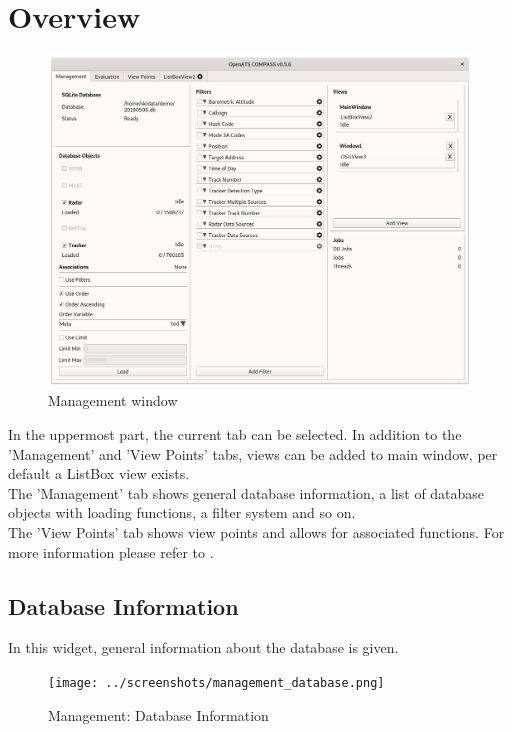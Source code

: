 \section{Overview}
\label{sec:management_overview}

\begin{figure}[H]
  \hspace*{-2.5cm}
    \includegraphics[width=19cm]{../screenshots/management.png}
  \caption{Management window}
\end{figure}

In the uppermost part, the current tab can be selected. In addition to the 'Management' and 'View Points' tabs, views can be added to main window, per default a ListBox view exists. \\

The 'Management' tab shows general database information, a list of database objects with loading functions, a filter system and so on. \\

The 'View Points' tab shows view points and allows for associated functions. For more information please refer to .

\subsection{Database Information}

In this widget, general information about the database is given. 

\begin{figure}[H]
  \center
    \texttt{[image: ../screenshots/management\_database.png]}
  \caption{Management: Database Information}
\end{figure}

